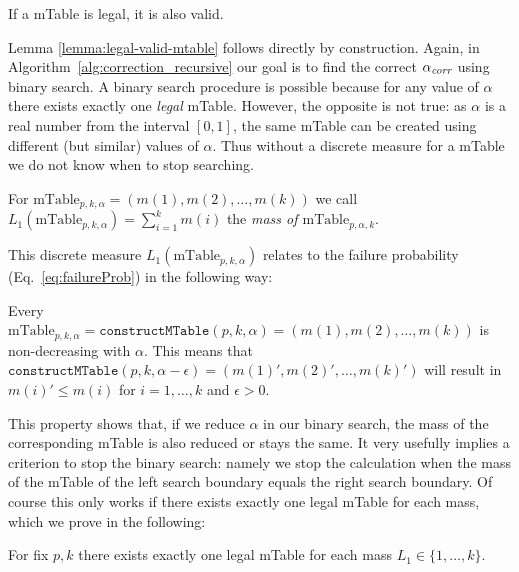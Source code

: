 %
\begin{lemma}
	\label{lemma:legal-valid-mtable}
	If a mTable is legal, it is also valid.
\end{lemma}
%
\noindent Lemma \ref{lemma:legal-valid-mtable} follows directly by construction. Again, in Algorithm~\ref{alg:correction_recursive} our goal is to find the correct $\alpha_\textit{corr}$ using binary search.
%
A binary search procedure is possible because for any value of $\alpha$ there exists exactly one \emph{legal} mTable.
%
However, the opposite is not true: as $\alpha$ is a real number from the interval $[0, 1]$, the same mTable can be created using different (but similar) values of $\alpha$.
%
Thus without a discrete measure for a mTable we do not know when to stop searching.
%
\begin{definition}
\label{def:Mass of a MTable}
For $\text{mTable}_{p,k,\alpha}=(m(1) , m(2) , \ldots , m(k))$ we call\\
$L_1(\text{mTable}_{p,k,\alpha})=\sum_{i=1}^k m(i)$ the \textit{mass of $\text{mTable}_{p,\alpha,k}$}.
\end{definition}
\noindent This discrete measure $L_1(\text{mTable}_{p,k,\alpha})$ relates to the failure probability (Eq.~\ref{eq:failureProb})
in the following way:
\begin{lemma}
\label{lemma:non-decreasing-with-alpha-mtable}
Every $\text{mTable}_{p,k,\alpha}=\texttt{constructMTable}(p,k,\alpha)=(m(1) , m(2) , \ldots , m(k))$ is non-decreasing with $\alpha$. This means that
$\texttt{constructMTable}(p,k,\alpha - \epsilon) = (m(1)' , m(2)' , \ldots , m(k)')$ will result in $m(i)' \leq m(i)$ for $i=1,\ldots,k$ and $\epsilon > 0$.
\end{lemma}
\noindent This property shows that, if we reduce $\alpha$ in our binary search, the mass of the corresponding mTable is also reduced or stays the same.
%
It very usefully implies a criterion to stop the binary search: namely we stop the calculation when the mass of the mTable of the left search boundary equals the right search boundary.
%
Of course this only works if there exists exactly one legal mTable for each mass, which we prove in the following:
%
\begin{theorem}
\label{theorem: mtable-mass-injection}
For fix $p,k$ there exists exactly one legal mTable for each mass $L_1\in \lbrace 1,\ldots,k \rbrace$.
\end{theorem}

